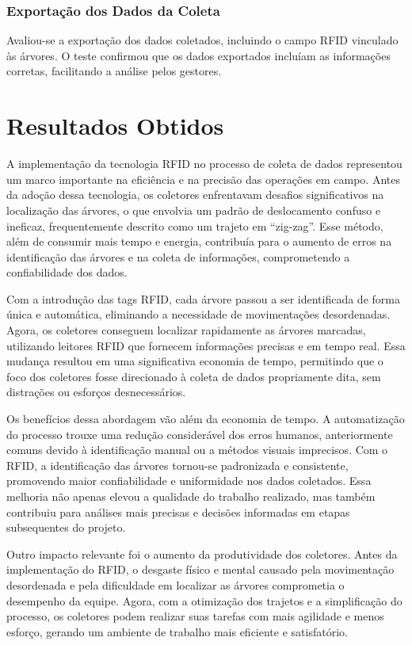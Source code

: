 \subsubsection{Exportação dos Dados da Coleta}
Avaliou-se a exportação dos dados coletados, incluindo o campo RFID vinculado às árvores. O teste confirmou que os dados exportados incluíam as informações corretas, facilitando a análise pelos gestores.

\section{Resultados Obtidos}
A implementação da tecnologia RFID no processo de coleta de dados representou um marco importante na eficiência e na precisão das operações em campo. Antes da adoção dessa tecnologia, os coletores enfrentavam desafios significativos na localização das árvores, o que envolvia um padrão de deslocamento confuso e ineficaz, frequentemente descrito como um trajeto em “zig-zag”. Esse método, além de consumir mais tempo e energia, contribuía para o aumento de erros na identificação das árvores e na coleta de informações, comprometendo a confiabilidade dos dados.

Com a introdução das tags RFID, cada árvore passou a ser identificada de forma única e automática, eliminando a necessidade de movimentações desordenadas. Agora, os coletores conseguem localizar rapidamente as árvores marcadas, utilizando leitores RFID que fornecem informações precisas e em tempo real. Essa mudança resultou em uma significativa economia de tempo, permitindo que o foco dos coletores fosse direcionado à coleta de dados propriamente dita, sem distrações ou esforços desnecessários.

Os benefícios dessa abordagem vão além da economia de tempo. A automatização do processo trouxe uma redução considerável dos erros humanos, anteriormente comuns devido à identificação manual ou a métodos visuais imprecisos. Com o RFID, a identificação das árvores tornou-se padronizada e consistente, promovendo maior confiabilidade e uniformidade nos dados coletados. Essa melhoria não apenas elevou a qualidade do trabalho realizado, mas também contribuiu para análises mais precisas e decisões informadas em etapas subsequentes do projeto.

Outro impacto relevante foi o aumento da produtividade dos coletores. Antes da implementação do RFID, o desgaste físico e mental causado pela movimentação desordenada e pela dificuldade em localizar as árvores comprometia o desempenho da equipe. Agora, com a otimização dos trajetos e a simplificação do processo, os coletores podem realizar suas tarefas com mais agilidade e menos esforço, gerando um ambiente de trabalho mais eficiente e satisfatório.

